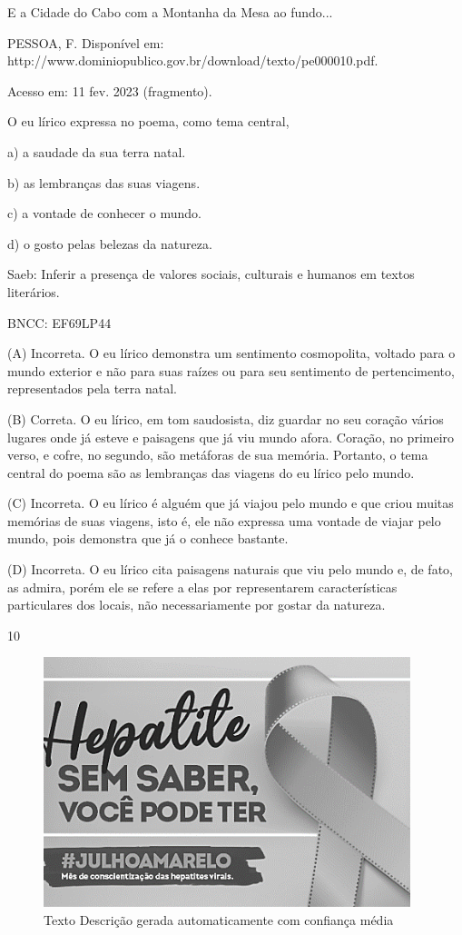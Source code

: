 E a Cidade do Cabo com a Montanha da Mesa ao fundo...

PESSOA, F. Disponível em:
http://www.dominiopublico.gov.br/download/texto/pe000010.pdf.

Acesso em: 11 fev. 2023 (fragmento).

O eu lírico expressa no poema, como tema central,

a) a saudade da sua terra natal.

b) as lembranças das suas viagens.

c) a vontade de conhecer o mundo.

d) o gosto pelas belezas da natureza.

Saeb: Inferir a presença de valores sociais, culturais e humanos em
textos literários.

BNCC: EF69LP44

(A) Incorreta. O eu lírico demonstra um sentimento cosmopolita, voltado
para o mundo exterior e não para suas raízes ou para seu sentimento de
pertencimento, representados pela terra natal.

(B) Correta. O eu lírico, em tom saudosista, diz guardar no seu coração
vários lugares onde já esteve e paisagens que já viu mundo afora.
Coração, no primeiro verso, e cofre, no segundo, são metáforas de sua
memória. Portanto, o tema central do poema são as lembranças das viagens
do eu lírico pelo mundo.

(C) Incorreta. O eu lírico é alguém que já viajou pelo mundo e que criou
muitas memórias de suas viagens, isto é, ele não expressa uma vontade de
viajar pelo mundo, pois demonstra que já o conhece bastante.

(D) Incorreta. O eu lírico cita paisagens naturais que viu pelo mundo e,
de fato, as admira, porém ele se refere a elas por representarem
características particulares dos locais, não necessariamente por gostar
da natureza.

\num{10}

\begin{figure}
\centering
\includegraphics[width=4.21103in,height=2.86458in]{./imgSAEB_8_POR/media/image31.png}
\caption{Texto Descrição gerada automaticamente com confiança média}
\end{figure}

